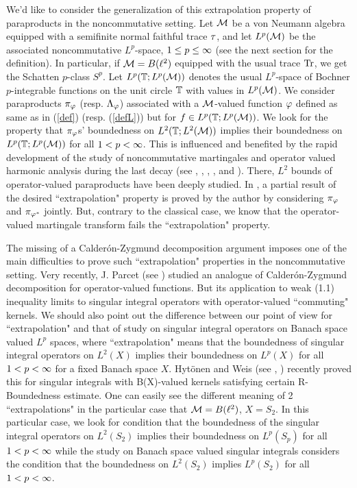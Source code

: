 We'd like to consider the generalization of this extrapolation
property of paraproducts in the noncommutative setting. Let ${\mathcal M}$ be
a von Neumann algebra equipped with a semifinite normal faithful
trace $\tau$, and let $L^p({\mathcal M})$ be the associated noncommutative
$L^p$-space, $1\le p\le\infty$ (see the next section for the
definition). In particular, if ${\mathcal M}=B(\ell^2)$ equipped with the usual
trace $\mbox{\rm Tr}$, we get the Schatten $p$-class $S^p$. Let $L^p({\mathbb T};
L^p({\mathcal M}))$ denotes the usual $L^p$-space of Bochner $p$-integrable
functions on the unit circle ${\mathbb T}$ with values in $L^p({\mathcal M})$. We
consider paraproducts $\pi_\varphi$ (resp. $\Lambda_\varphi$) associated with
a ${\mathcal M}$-valued function $\varphi$ defined as same as in (\ref{def}) (resp.
(\ref{defL})) but for $f\in L^p({\mathbb T}; L^p({\mathcal M}))$. We look for the
property that $\pi_\varphi$s' boundedness on $L^2({\mathbb T}; L^2({\mathcal M}))$ implies
their boundedness on $L^p({\mathbb T}; L^p({\mathcal M}))$ for all $1<p<\infty$. This is
influenced and benefited by the rapid development of the study of
noncommutative martingales and operator valued harmonic analysis
during the last decay (see \cite{K}, \cite{NPTV}, \cite{NTV},
\cite{BP}, \cite{Me} and \cite{Me2} ). There, $L^2$ bounds of
operator-valued paraproducts have been deeply studied. In \cite{Me},
a partial result of the desired ``extrapolation" property is proved
by the author by considering $\pi_\varphi$ and $\pi_{\varphi^*}$ jointly. But,
contrary to the classical case, we know that the operator-valued
martingale transform fails the ``extrapolation" property.

The missing of a Calder\'on-Zygmund decomposition argument imposes
one of the main difficulties to prove such ``extrapolation"
properties in the noncommutative setting. Very recently, J. Parcet
(see \cite{PJ}) studied an analogue of Calder\'on-Zygmund
decomposition for operator-valued functions. But its application to
weak (1.1) inequality limits to singular integral operators with
operator-valued ``commuting" kernels. We should also point out the
difference between our point of view for ``extrapolation" and that
of study on singular integral operators on Banach space valued $L^p$
spaces, where ``extrapolation" means that the boundedness of
singular integral operators on $L^2(X)$ implies their boundedness on
$L^p(X)$ for all $1<p<\infty$ for a fixed Banach space $X$. Hyt\"onen
and Weis (see \cite{HW1}, \cite{HW2}) recently proved this for
singular integrals with B(X)-valued kernels satisfying certain
R-Boundedness estimate. One can easily see the different meaning of
2 ``extrapolations" in the particular case that ${\mathcal M}=B(\ell^2)$,
$X=S_2$. %
In this particular case, we look for condition that the boundedness
of the singular integral operators on $L^2(S_2)$ implies their
boundedness on $L^p(S_p)$ for all $1<p<\infty$ while the study on Banach
space valued singular integrals considers the condition that the
boundedness on $L^2(S_2)$ implies $L^p(S_2)$ for all $1<p<\infty$.

